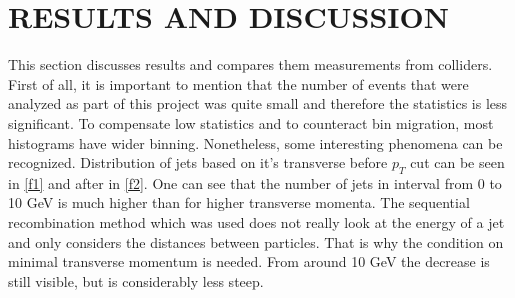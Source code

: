\documentclass[a4paper,10pt]{article}
\begin{document}
\section{RESULTS AND DISCUSSION}
\label{results}
This section discusses results and compares them measurements from colliders. First of all, it is important to mention that the number of events that were analyzed as part of this project was quite small and therefore the statistics is less significant. To compensate low statistics and to counteract bin migration, most histograms have wider binning. Nonetheless, some interesting phenomena can be recognized. 
\newline
\noindent Distribution of jets based on it's transverse before $p_T$ cut can be seen in \autoref{f1} and after in \autoref{f2}. One can see that the number of jets in interval from 0 to 10 GeV is much higher than for higher transverse momenta. The sequential recombination method which was used does not really look at the energy of a jet and only considers the distances between particles. That is why the condition on minimal transverse momentum is needed. From around 10 GeV the decrease is still visible, but is considerably less steep.
\end{document}
